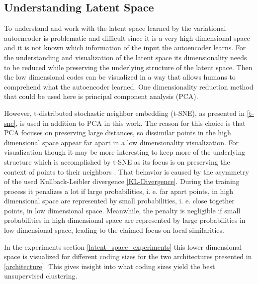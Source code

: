 \subsection{Understanding Latent Space} \label{section_understanding_latent_space}

To understand and work with the latent space learned by the variational autoencoder is problematic and
difficult since it is a very high dimensional space and it is not known which information of the input the
autoencoder learns. For the understanding and visualization of the latent space its dimensionality needs
to be reduced while preserving the underlying structure of the latent space. Then the low dimensional
codes can be visualized in a way that allows humans to comprehend what the autoencoder learned.
One dimensionality reduction method that could be used here is principal component analysis (PCA).

However,
t-distributed stochastic neighbor embedding (t-SNE), as presented in \ref{t-sne}, is used in addition
to PCA in this work.
The reason for this choice is that PCA focuses on preserving large distances, so dissimilar points in the
high dimensional space appear far apart in a low dimensionality visualization. For visualization though
it may be more interesting to keep more of the underlying structure which is accomplished by t-SNE as its
focus is on preserving the context of points to their neighbors \parencite{2008-vanDerMaaten-visualizing}.
That behavior is caused by the asymmetry of the used Kullback-Leibler divergence \ref{KL-Divergence}.
During the training process it penalizes a lot if large probabilities, i. e. far apart points, in high dimensional
space are represented by small probabilities, i. e. close together points, in low dimensional space. Meanwhile, the 
penalty is negligible if small probabilities in high dimensional space are represented by large probabilities in
low dimensional space, leading to the claimed focus on local similarities.

In the experiments section \ref{latent_space_experiments} this lower dimensional space is visualized
for different coding sizes for the two architectures presented in \ref{architecture}.
This gives insight into what coding sizes yield the best unsupervised clustering.

